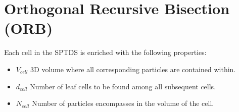 \documentclass[]{article}
\begin{document}
\begin{comment}
				\end{tikzpicture}
			\end{minipage}
			\pgfmathsetseed{10}
			\begin{minipage}[c]{0.2\linewidth}
				\begin{tikzpicture}
					\foreach \i in {1,...,80}{
						\filldraw [red] (rnd*\linewidth,rnd*\linewidth) circle (1pt) node [anchor=west]{};
					}
					\draw[fill=white] (0,0) rectangle (\linewidth*0.55,  \linewidth*0.6);
					\draw (\linewidth*0.55,0) rectangle (\linewidth,  \linewidth*0.5);
					\draw[fill=white] (0,\linewidth*0.6) rectangle (\linewidth*0.55,  \linewidth);
					\draw[fill=white] (\linewidth*0.55,\linewidth*0.5) rectangle (\linewidth,  \linewidth);
				\end{tikzpicture}
			\end{minipage}	
			\pgfmathsetseed{10}
			\begin{minipage}[c]{0.2\linewidth}
				\begin{tikzpicture}
					\foreach \i in {1,...,80}{
						\filldraw [red] (rnd*\linewidth,rnd*\linewidth) circle (1pt) node [anchor=west]{};
					}
					\draw (0,0) rectangle (\linewidth*0.55,  \linewidth*0.6);
					\draw[fill=white] (\linewidth*0.55,0) rectangle (\linewidth,  \linewidth*0.5);
					\draw[fill=white] (0,\linewidth*0.6) rectangle (\linewidth*0.55,  \linewidth);
					\draw[fill=white] (\linewidth*0.55,\linewidth*0.5) rectangle (\linewidth,  \linewidth);
				\end{tikzpicture}
			\end{minipage}
		\end{center}
		\caption{Leaf cells of data structure are distributed among nodes}
	\end{figure}
\end{enumerate}
\end{comment}


\newpage
\section{Orthogonal Recursive Bisection (ORB)} \label{section:orb}


Each cell in the SPTDS is enriched with the following properties:

\begin{itemize}
	\item \textbf{$V_{cell}$} 3D volume where all corresponding particles are contained within.
	\item \textbf{$d_{cell}$} Number of leaf cells to be found among all subsequent cells.
	\item \textbf{$N_{cell}$} Number of particles encompasses in the volume of the cell. 
\end{itemize}
\end{document}
